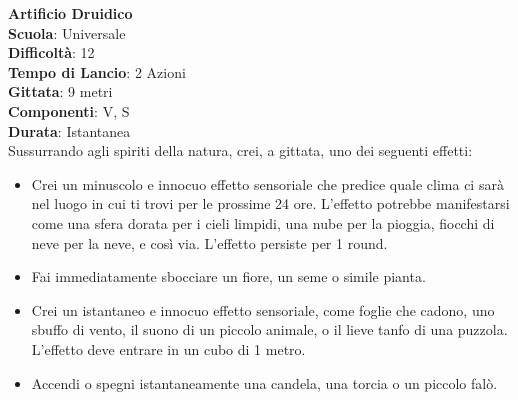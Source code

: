 \begin{multicols}{2}
\medskip\textbf{Artificio Druidico}\\
\textbf{Scuola}: Universale\\
\textbf{Difficoltà}: 12\\
\textbf{Tempo di Lancio}: 2 Azioni\\
\textbf{Gittata}: 9 metri\\
\textbf{Componenti}: V, S\\
\textbf{Durata}: Istantanea\\
Sussurrando agli spiriti della natura, crei, a gittata, uno dei seguenti effetti:
\begin{itemize}
\item
Crei un minuscolo e innocuo effetto sensoriale che predice quale clima ci sarà nel luogo in cui ti trovi per le prossime 24 ore. L'effetto potrebbe manifestarsi come una sfera dorata per i cieli limpidi, una nube per la pioggia, fiocchi di neve per la neve, e così via. L'effetto persiste per 1 round.
\item 
Fai immediatamente sbocciare un fiore, un seme o simile pianta.
\item 
Crei un istantaneo e innocuo effetto sensoriale, come foglie che cadono, uno sbuffo di vento, il suono di un piccolo animale, o il lieve tanfo di una puzzola. L'effetto deve entrare in un cubo di 1 metro.
\item Accendi o spegni istantaneamente una candela, una torcia o un piccolo falò.
\end{itemize}


\end{multicols}
